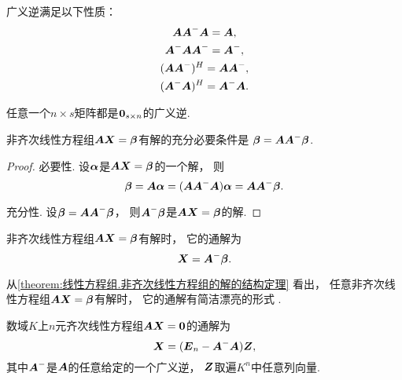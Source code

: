 \begin{property}\label{theorem:线性方程组.广义逆的性质1}
广义逆满足以下性质：\begin{gather}
	\boldsymbol{A}\boldsymbol{A}^-\boldsymbol{A}=\boldsymbol{A}, \\
	\boldsymbol{A}^-\boldsymbol{A}\boldsymbol{A}^-=\boldsymbol{A}^-, \\
	(\boldsymbol{A}\boldsymbol{A}^-)^H=\boldsymbol{A}\boldsymbol{A}^-, \\
	(\boldsymbol{A}^-\boldsymbol{A})^H=\boldsymbol{A}^-\boldsymbol{A}.
\end{gather}
\end{property}

\begin{property}\label{theorem:线性方程组.广义逆的性质2}
任意一个\(n \times s\)矩阵都是\(\boldsymbol0_{s \times n}\)的广义逆.
\end{property}

\begin{theorem}[非齐次线性方程组的相容性定理]\label{theorem:线性方程组.非齐次线性方程组的相容性定理}
非齐次线性方程组\(\boldsymbol{A} \boldsymbol{X} = \boldsymbol\beta\)有解的充分必要条件是
\(\boldsymbol\beta = \boldsymbol{A} \boldsymbol{A}^- \boldsymbol\beta\).
\begin{proof}
必要性.
设\(\boldsymbol\alpha\)是\(\boldsymbol{A} \boldsymbol{X} = \boldsymbol\beta\)的一个解，
则\begin{equation*}
	\boldsymbol\beta
	= \boldsymbol{A} \boldsymbol\alpha
	= (\boldsymbol{A} \boldsymbol{A}^- \boldsymbol{A}) \boldsymbol\alpha
	= \boldsymbol{A} \boldsymbol{A}^- \boldsymbol\beta.
\end{equation*}

充分性.
设\(\boldsymbol\beta = \boldsymbol{A} \boldsymbol{A}^- \boldsymbol\beta\)，
则\(\boldsymbol{A}^- \boldsymbol\beta\)是\(\boldsymbol{A} \boldsymbol{X} = \boldsymbol\beta\)的解.
\end{proof}
\end{theorem}

\begin{theorem}[非齐次线性方程组的解的结构定理]\label{theorem:线性方程组.非齐次线性方程组的解的结构定理}
非齐次线性方程组\(\boldsymbol{A} \boldsymbol{X} = \boldsymbol\beta\)有解时，
它的通解为\begin{equation}\label{equation:线性方程组.非齐次线性方程组的通解1}
	\boldsymbol{X} = \boldsymbol{A}^- \boldsymbol\beta.
\end{equation}
\end{theorem}
从\cref{theorem:线性方程组.非齐次线性方程组的解的结构定理} 看出，
任意非齐次线性方程组\(\boldsymbol{A} \boldsymbol{X} = \boldsymbol\beta\)有解时，
它的通解有简洁漂亮的形式 .

\begin{theorem}[齐次线性方程组的解的结构定理]\label{theorem:线性方程组.齐次线性方程组的解的结构定理}
数域\(K\)上\(n\)元齐次线性方程组\(\boldsymbol{A}\boldsymbol{X}=\boldsymbol0\)的通解为\begin{equation}\label{equation:线性方程组.齐次线性方程组的通解}
	\boldsymbol{X}=(\boldsymbol{E}_n - \boldsymbol{A}^- \boldsymbol{A}) \boldsymbol{Z},
\end{equation}
其中\(\boldsymbol{A}^-\)是\(\boldsymbol{A}\)的任意给定的一个广义逆，
\(\boldsymbol{Z}\)取遍\(K^n\)中任意列向量.
\end{theorem}

